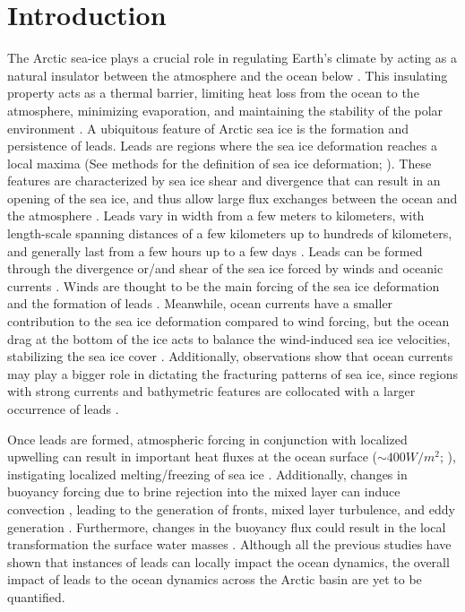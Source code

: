 \documentclass[draft]{agujournal2019}
\begin{document}
\section{Introduction}

The Arctic sea-ice plays a crucial role in regulating Earth's climate by acting as a natural insulator between the atmosphere and the ocean below \citep{Wettlaufer_insulator_1997, Untersteiner_ice_insulator_1961}. This insulating property acts as a thermal barrier, limiting heat loss from the ocean to the atmosphere, minimizing evaporation, and maintaining the stability of the polar environment \citep{Ruffieux_pack_lead_1995}. A ubiquitous feature of Arctic sea ice is the formation and persistence of leads. Leads are regions where the sea ice deformation reaches a local maxima (See methods for the definition of sea ice deformation; \citealt{Hutter_identification_2019}). These features are characterized by sea ice shear and divergence that can result in an opening of the sea ice, and thus allow large flux exchanges between the ocean and the atmosphere \citep{Lupkes_leads_2008}. Leads vary in width from a few meters to kilometers, with length-scale spanning distances of a few kilometers up to hundreds of kilometers, and generally last from a few hours up to a few days \citep{Linow_lkf_2017, Wernecke_Lead_2015, Tschudi_obs_leads_1998}. Leads can be formed through the divergence or/and shear of the sea ice forced by winds and oceanic currents \citep{Rampal_nextsim_2016, Hutchings_model_lkf_2005, Richter_pack_stress_2002}. Winds are thought to be the main forcing of the sea ice deformation and the formation of leads \citep{Linow_lkf_2017, Hutter_scaling_lkf_2018}. Meanwhile, ocean currents have a smaller contribution to the sea ice deformation compared to wind forcing, but the ocean drag at the bottom of the ice acts to balance the wind-induced sea ice velocities, stabilizing the sea ice cover \citep{Weiss_scale_2004}. Additionally, observations show that ocean currents may play a bigger role in dictating the fracturing patterns of sea ice, since regions with strong currents and bathymetric features are collocated with a larger occurrence of leads \citep{Willmes_leads_currents_2023}. 

Once leads are formed, atmospheric forcing in conjunction with localized upwelling can result in important heat fluxes at the ocean surface ($\sim 400 W/m^2$; \citealp{McPhee_LKF_2005,Marcq_flux_lead_2012,Maykut_heat_1986}), instigating localized melting/freezing of sea ice \citep{Albedyll_thickness_dis_2022}. Additionally, changes in buoyancy forcing due to brine rejection into the mixed layer can induce convection \citep{Smith_convection_1998}, leading to the generation of fronts, mixed layer turbulence, and eddy generation \citep{Reiser_LKF_2020, Smith_generation_2002}. Furthermore, changes in the buoyancy flux could result in the local transformation the surface water masses \citep{Pemberton_WMT_2015, Smith_polynyas_1990, Walin_WMT_1982}. 
Although all the previous studies have shown that instances of leads can locally impact the ocean dynamics, the overall impact of leads to the ocean dynamics across the Arctic basin are yet to be quantified. 
\end{document}
